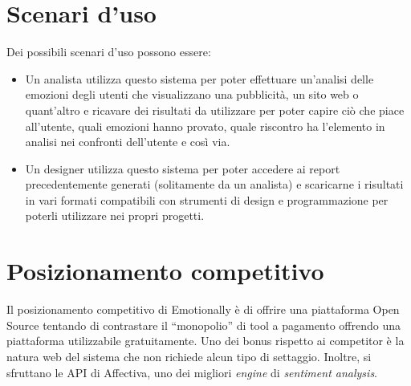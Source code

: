 \section{Scenari d'uso}\label{sec:scenari-duso}
Dei possibili scenari d'uso possono essere:
\begin{itemize}
	\item Un analista utilizza questo sistema per poter effettuare un'analisi 
	delle emozioni degli utenti che visualizzano una pubblicità, un sito web o 
	quant'altro e ricavare dei risultati da utilizzare per poter capire ciò che 
	piace all'utente, quali emozioni hanno provato, quale riscontro ha 
	l'elemento in analisi nei confronti dell'utente e così via.
	\item Un designer utilizza questo sistema per poter accedere ai report 
	precedentemente generati (solitamente da un analista) e scaricarne i 
	risultati in vari formati compatibili con strumenti di design e 
	programmazione per poterli utilizzare nei propri progetti.
\end{itemize}

\section{Posizionamento competitivo}\label{sec:posizionamento-competitivo}

Il posizionamento competitivo di Emotionally è di offrire una piattaforma Open 
Source tentando di contrastare il ``monopolio'' di tool a pagamento offrendo 
una piattaforma utilizzabile gratuitamente. Uno dei bonus rispetto ai 
competitor è la natura web del sistema che non richiede alcun tipo di 
settaggio. Inoltre, si sfruttano le API di Affectiva, uno dei migliori 
\textit{engine} di \textit{sentiment analysis}.
